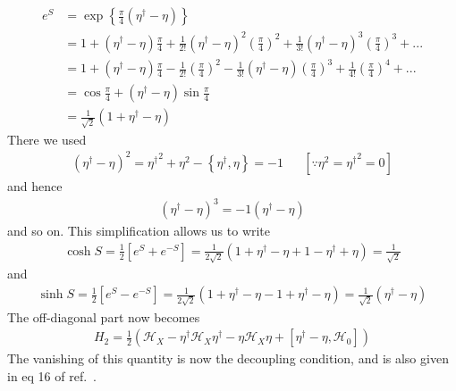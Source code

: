 \begin{equation}\begin{aligned}
	e^S &= \exp\left\{\frac{\pi}{4}\left(\eta^\dagger - \eta\right)\right\} \\
	    &= 1 + \left(\eta^\dagger - \eta\right)\frac{\pi}{4} + \frac{1}{2!}\left(\eta^\dagger - \eta\right)^2\left(\frac{\pi}{4}\right)^2 + \frac{1}{3!}\left(\eta^\dagger - \eta\right)^3\left(\frac{\pi}{4}\right)^3 + ...\\
	    &= 1 + \left(\eta^\dagger - \eta\right)\frac{\pi}{4} - \frac{1}{2!}\left(\frac{\pi}{4}\right)^2 - \frac{1}{3!}\left(\eta^\dagger - \eta\right)\left(\frac{\pi}{4}\right)^3 + \frac{1}{4!}\left(\frac{\pi}{4}\right)^4 + ...\\
	    &= \cos \frac{\pi}{4} + \left(\eta^\dagger - \eta\right)\sin\frac{\pi}{4}\\
	    &= \frac{1}{\sqrt 2}\left(1 + \eta^\dagger - \eta\right)
\end{aligned}\end{equation}
There we used
\begin{equation}\begin{aligned}
	\left(\eta^\dagger - \eta\right)^2 = {\eta^\dagger}^2 + \eta^2 - \left\{\eta^\dagger,\eta\right\} = -1 &&\left[\because\eta^2 = {\eta^\dagger}^2=0\right]
\end{aligned}\end{equation}
and hence
\begin{equation}\begin{aligned}
	\left(\eta^\dagger - \eta\right)^3 = -1\left(\eta^\dagger - \eta\right)
\end{aligned}\end{equation}
and so on. This simplification allows us to write
\begin{equation}\begin{aligned}
	\label{cossin}
	\cosh S = \frac{1}{2}\left[e^S + e^{-S}\right] = \frac{1}{2\sqrt 2}\left(1 + \eta^\dagger - \eta + 1 - \eta^\dagger + \eta\right) = \frac{1}{\sqrt 2}
\end{aligned}\end{equation}
and
\begin{equation}\begin{aligned}
	\sinh S = \frac{1}{2}\left[e^S - e^{-S}\right] = \frac{1}{2\sqrt 2}\left(1 + \eta^\dagger - \eta - 1 + \eta^\dagger - \eta\right) = \frac{1}{\sqrt 2}\left(\eta^\dagger - \eta\right)
\end{aligned}\end{equation}
The off-diagonal part now becomes
\begin{equation}\begin{aligned}
	H_2 = \frac{1}{2}\left(\mathcal{H}_X - \eta^\dagger \mathcal{H}_X \eta^\dagger - \eta \mathcal{H}_X \eta + \left[\eta^\dagger - \eta, \mathcal{H}_0\right]\right)
\end{aligned}\end{equation}
The vanishing of this quantity is now the decoupling condition, and is also given in eq 16 of ref.~\cite{anirbanurg1}.

